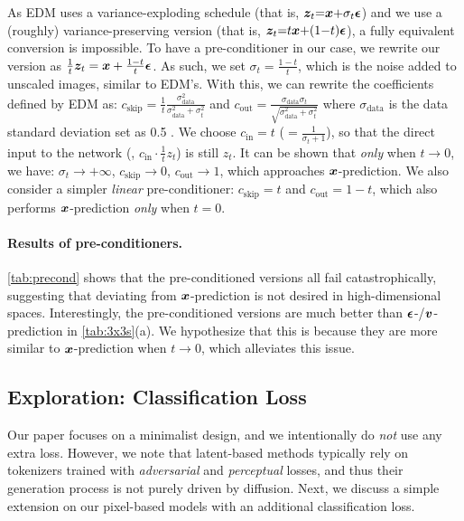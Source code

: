 As EDM \cite{Karras2022edm} uses a variance-exploding schedule (that is, $\bm{z}_t{=}\bm{x}{+}\sigma_t\bm{\epsilon}$)  and we use a (roughly) variance-preserving version (that is, $\bm{z}_t{=}t\bm{x}{+}(1{-}t)\bm{\epsilon}$), a fully equivalent conversion is impossible. 
To have a pre-conditioner in our case, we rewrite our version as $
\frac{1}{t} \bm{z}_t = \bm{x} + \frac{1 - t}{t}\bm{\epsilon}
$. As such, we set $\sigma_t = \frac{1-t}{t}$, which is the noise added to unscaled images, similar to EDM's.
With this, we can rewrite the coefficients defined by EDM \cite{Karras2022edm} as:
$c_\text{skip}=\frac{1}{t} \frac{\sigma_\text{data}^2}{\sigma_\text{data}^2 + \sigma_t^2}$
and $c_\text{out}=\frac{\sigma_\text{data}\sigma_t}{\sqrt{\sigma_\text{data}^2 + \sigma_t^2}}$
where $\sigma_\text{data}$ is the data standard deviation set as 0.5 \cite{Karras2022edm}. We choose $c_\text{in}= t$ ($=\frac{1}{\sigma_t+1}$), so that the direct input to the network (\ie, $c_\text{in}\cdot\frac{1}{t}z_t$) is still $z_t$.
It can be shown that \textit{only} when
$t \rightarrow 0$, we have: $\sigma_t{\rightarrow}+ \infty$, $c_\text{skip}{\rightarrow}0$, $c_\text{out}{\rightarrow}1$,
which approaches $\bm{x}$-prediction.
We also consider a simpler \textit{linear} pre-conditioner:
$c_\text{skip}=t$ and $c_\text{out}=1 - t$,
which also performs $\bm{x}$-prediction \textit{only} when $t = 0$.

\paragraph{Results of pre-conditioners.}
\cref{tab:precond} shows that the pre-conditioned versions all fail catastrophically, suggesting that deviating from $\bm{x}$-prediction is not desired in high-dimensional spaces. Interestingly, the pre-conditioned versions are much better than $\bm{\epsilon}$-/$\bm{v}$-prediction in \cref{tab:3x3s}(a). We hypothesize that this is because they are more similar to $\bm{x}$-prediction when $t{\rightarrow}0$, which alleviates this issue.

\subsection{Exploration: Classification Loss}

Our paper focuses on a minimalist design, and we intentionally do \textit{not} use any extra loss. However, we note that latent-based methods \cite{Rombach2022} typically rely on tokenizers trained with \textit{adversarial} and \textit{perceptual} losses, and thus their generation process is not purely driven by diffusion. Next, we discuss a simple extension on our pixel-based models with an additional classification loss.

